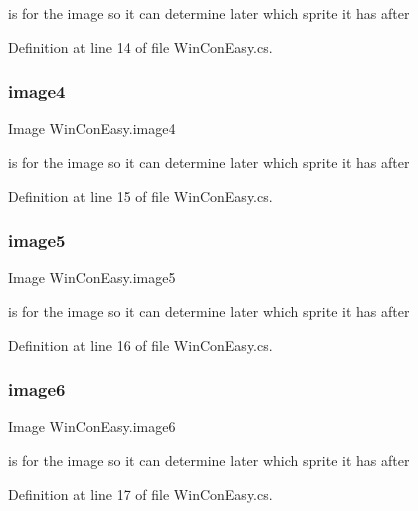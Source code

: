 is for the image so it can determine later which sprite it has after 

Definition at line 14 of file Win\+Con\+Easy.\+cs.

\mbox{\label{class_win_con_easy_a47d9616fefba9bb130086a26fed4b416}} 
\subsubsection{\texorpdfstring{image4}{image4}}
{\footnotesize\ttfamily Image Win\+Con\+Easy.\+image4}

is for the image so it can determine later which sprite it has after 

Definition at line 15 of file Win\+Con\+Easy.\+cs.

\mbox{\label{class_win_con_easy_a33d3d74457b53c7ce4ad0c1879000fea}} 
\subsubsection{\texorpdfstring{image5}{image5}}
{\footnotesize\ttfamily Image Win\+Con\+Easy.\+image5}

is for the image so it can determine later which sprite it has after 

Definition at line 16 of file Win\+Con\+Easy.\+cs.

\mbox{\label{class_win_con_easy_af8d39251637fd9f2a683cc52469523de}} 
\subsubsection{\texorpdfstring{image6}{image6}}
{\footnotesize\ttfamily Image Win\+Con\+Easy.\+image6}

is for the image so it can determine later which sprite it has after 

Definition at line 17 of file Win\+Con\+Easy.\+cs.

\mbox{\label{class_win_con_easy_a07bb584530b0ed6bfc5409c8ef49735b}} 
